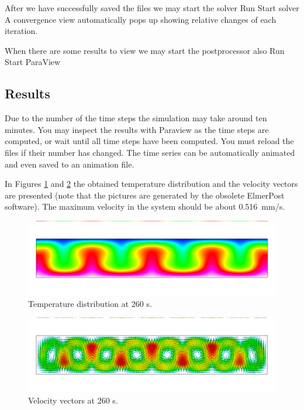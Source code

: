 After we have successfully saved the files we may start the solver
\ttbegin
Run
  Start solver
\ttend
A convergence view automatically pops up showing relative changes of each iteration.

When there are some results to view we may start the postprocessor also
\ttbegin
Run
  Start ParaView
\ttend


\subsection*{Results}

Due to the number of the time steps the simulation may take around ten minutes.
You may inspect the results with Paraview as the time steps are computed, or
wait until all time steps have been computed. You must reload the files if their number has changed. 
The time series can be automatically animated and even saved to an animation file.

In Figures \ref{fg:rb_temp} and \ref{fg:rb_vel} the obtained temperature 
distribution and the velocity vectors are presented (note that the pictures are generated by the obsolete ElmerPost software). 
The maximum velocity in the system should be about 0.516~mm/s. 

\begin{figure}[h]
\centering
\includegraphics[width=15cm, viewport=0 50 1000 250,clip]{rb_temp}
\caption{Temperature distribution at 260 s.}\label{fg:rb_temp}
\end{figure} 

\begin{figure}[h]
\centering
\includegraphics[width=15cm, viewport=0 50 1000 250,clip]{rb_velo}
\caption{Velocity vectors at 260 s.}\label{fg:rb_vel}
\end{figure} 



